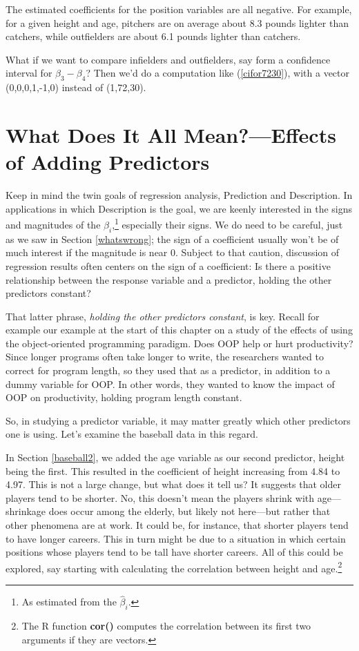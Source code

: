The estimated coefficients for the position variables are all negative.
For example, for a given height and age, pitchers are on average about
8.3 pounds lighter than catchers, while outfielders are about 6.1 pounds
lighter than catchers.

What if we want to compare infielders and outfielders, say form a
confidence interval for $\beta_3 - \beta_4$?  Then we'd do a computation
like (\ref{cifor7230}), with a vector (0,0,0,1,-1,0) instead of
(1,72,30).

\section{What Does It All Mean?---Effects of Adding Predictors}

Keep in mind the twin goals of regression analysis, Prediction and
Description.  In applications in which Description is the goal, we
are keenly interested in the signs and magnitudes of the
$\beta_i$,\footnote{As estimated from the $\widehat{\beta}_i$.}
especially their signs.  We do need to be careful, just as we saw in
Section \ref{whatswrong}; the sign of a coefficient usually won't be of
much interest if the magnitude is near 0.  Subject to that caution,
discussion of regression results often centers on the sign of a
coefficient:  Is there a positive relationship between the response
variable and a predictor, holding the other predictors constant?

That latter phrase, {\it holding the other predictors constant}, is key.
Recall for example our example at the start of this chapter on a study
of the effects of using the object-oriented programming paradigm.  Does
OOP help or hurt productivity?  Since longer programs often take longer
to write, the researchers wanted to correct for program length, so they
used that as a predictor, in addition to a dummy variable for OOP.  In
other words, they wanted to know the impact of OOP on productivity,
holding program length constant.

So, in studying a predictor variable, it may matter greatly which other
predictors one is using.  Let's examine the baseball data in this
regard.

In Section \ref{baseball2}, we added the age variable as our second
predictor, height being the first.  This resulted in the coefficient of
height increasing from 4.84 to 4.97.  This is not a large change, but
what does it tell us?  It suggests that older players tend to be
shorter.  No, this doesn't mean the players shrink with age---shrinkage
does occur among the elderly, but likely not here---but rather that
other phenomena are at work.  It could be, for instance, that shorter
players tend to have longer careers.  This in turn might be due to a
situation in which certain positions whose players tend to be tall have
shorter careers.  All of this could be explored, say starting with
calculating the correlation between height and age.\footnote{The R
function {\bf cor()} computes the correlation between its first two
arguments if they are vectors.}

